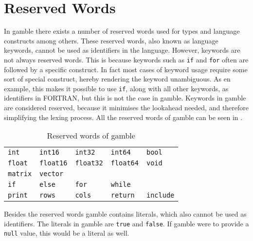 \section{Reserved Words}

\label{sec:reserved_words}
In \gls{gamble} there exists a number of reserved words used for types and language constructs among others.
These reserved words, also known as language keywords, cannot be used as identifiers in the language. However, keywords are not always reserved words.
This is because keywords such as \texttt{if} and \texttt{for} often are followed by a specific construct.
In fact most cases of keyword usage require some sort of special construct, hereby rendering the keyword unambiguous.
As en example, this makes it possible to use \texttt{if}, along with all other keywords, as identifiers in FORTRAN, but this is not the case in \gls{gamble}.\citep{fortran_identifiers}
Keywords in \gls{gamble} are considered reserved, because it minimises the lookahead needed, and therefore simplifying the lexing process.
All the reserved words of \gls{gamble} can be seen in  .
\begin{table}[h!]
	\centering
	\def\arraystretch{1.5} \setlength{\tabcolsep}{2em}
	\begin{tabular}{l l l l l}
        \texttt{int}     & \texttt{int16}     & \texttt{int32}     & \texttt{int64}     & \texttt{bool}    \\
        \texttt{float}   & \texttt{float16}   & \texttt{float32}   & \texttt{float64}   & \texttt{void}    \\
        \texttt{matrix}  & \texttt{vector}    &                    &                    &                  \\
        \texttt{if}      & \texttt{else}      & \texttt{for}       & \texttt{while}     &                  \\
        \texttt{print}   & \texttt{rows}      & \texttt{cols}      & \texttt{return}    & \texttt{include} \\
    \end{tabular}\caption{Reserved words of \gls{gamble}}\label{res:words}
	\def\arraystretch{1}
\end{table}

Besides the reserved words \gls{gamble} contains literals, which also cannot be used as identifiers.
The literals in \gls{gamble} are \texttt{true} and \texttt{false}.
If \gls{gamble} were to provide a \texttt{null} value, this would be a literal as well.

